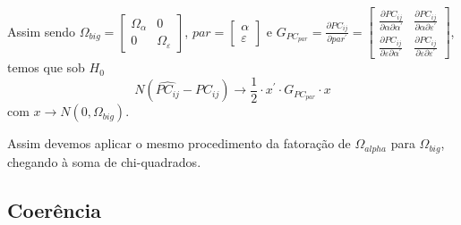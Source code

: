 \documentclass[a4paper,10pt]{article}
\begin{document}
Assim sendo $\Omega_{big} = \left[ \begin{array}{cc} 
 \Omega_{\alpha} & 0 \\ 0 & \Omega_{\varepsilon}
\end{array} \right]$, $par = \left[ \begin{array}{c} 
 \alpha \\ \varepsilon
\end{array} \right]$ e $G_{PC_{par}} = \frac{\partial PC_{ij}}{\partial par^{'}} = \left[ \begin{array}{cc} 
\frac{\partial PC_{ij}}{\partial \alpha \partial \alpha^{'}} & 
\frac{\partial PC_{ij}}{\partial \alpha \partial \varepsilon^{'}} \\ 
\frac{\partial PC_{ij}}{\partial \varepsilon \partial \alpha^{'}} & 
\frac{\partial PC_{ij}}{\partial \varepsilon \partial \varepsilon^{'}}
\end{array} \right]$, temos que sob $H_0$
\begin{equation}
N (\hat{PC_{ij}} - PC_{ij}) \to \frac{1}{2} \cdot x^{'} \cdot G_{PC_{par}} \cdot x
\end{equation}
com $x \to N(0, \Omega_{big})$.

Assim devemos aplicar o mesmo procedimento da fatoração de $\Omega_{alpha}$ para $\Omega_{big}$, chegando à soma de chi-quadrados.

\subsection{Coerência}
\end{document}
